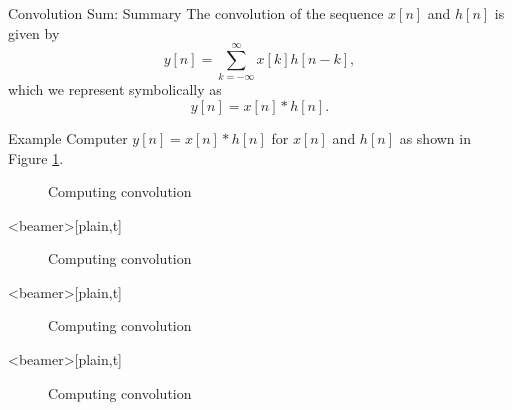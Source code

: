 \begin{frame}{Convolution Sum: Summary}
    The convolution of the sequence $x[n]$ and $h[n]$ is given by
    \begin{equation}\label{eq:convolution_sum}
        y[n] = \sum_{k=-\infty}^{\infty}x[k]h[n-k],
    \end{equation}
    which we represent symbolically as
    \begin{equation}\label{eq:convolution_symbol}
        y[n] = x[n]\ast h[n].
    \end{equation}
\end{frame}


\begin{frame}{Example}
    Computer $y[n] = x[n]\ast h[n]$ for $x[n]$ and $h[n]$ as shown in Figure \ref{fi:example01_discrete_conv_signals}.
    {
    \begin{figure}
      \centering
      
      \caption{Computing convolution}\label{fi:example01_discrete_conv_signals}
    \end{figure}
    }
\end{frame}

\begin{frame}<beamer>[plain,t]
    {
    \begin{figure}
      \centering
      
      \caption{Computing convolution}\label{fi:example01_discrete_conv_01}
    \end{figure}
    }
\end{frame}

\begin{frame}<beamer>[plain,t]
    {
    \begin{figure}
      \centering
      
      \caption{Computing convolution}\label{fi:example01_discrete_conv_02}
    \end{figure}
    }
\end{frame}



\begin{frame}<beamer>[plain,t]
    {
    \begin{figure}
      \centering
      
      \caption{Computing convolution}\label{fi:example01_discrete_conv_03}
    \end{figure}
    }
\end{frame}




